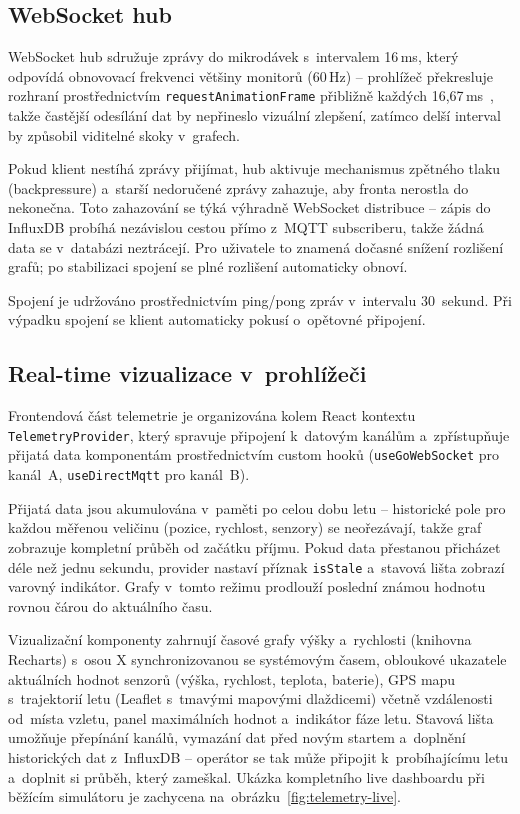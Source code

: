 \subsection{WebSocket hub}

WebSocket hub sdružuje zprávy do mikrodávek s~intervalem 16\,ms, který odpovídá obnovovací frekvenci většiny monitorů (60\,Hz) -- prohlížeč překresluje rozhraní prostřednictvím \texttt{request\-Animation\-Frame} přibližně každých 16{,}67\,ms~\cite{mdn2024raf}, takže častější odesílání dat by nepřineslo vizuální zlepšení, zatímco delší interval by způsobil viditelné skoky v~grafech.

Pokud klient nestíhá zprávy přijímat, hub aktivuje mechanismus zpětného tlaku (backpressure) a~starší nedoručené zprávy zahazuje, aby fronta nerostla do nekonečna. Toto zahazování se týká výhradně WebSocket distribuce -- zápis do InfluxDB probíhá nezávislou cestou přímo z~MQTT subscriberu, takže žádná data se v~databázi neztrácejí. Pro uživatele to znamená dočasné snížení rozlišení grafů; po stabilizaci spojení se plné rozlišení automaticky obnoví.

Spojení je udržováno prostřednictvím ping/pong zpráv v~intervalu 30~sekund. Při výpadku spojení se klient automaticky pokusí o~opětovné připojení.

\subsection{Real-time vizualizace v~prohlížeči}

\begin{sloppypar}
Frontendová část telemetrie je organizována kolem React kontextu \texttt{TelemetryProvider}, který spravuje připojení k~datovým kanálům a~zpřístupňuje přijatá data komponentám prostřednictvím custom hooků (\texttt{useGoWebSocket} pro kanál~A, \texttt{useDirectMqtt} pro kanál~B).
\end{sloppypar}

Přijatá data jsou akumulována v~paměti po celou dobu letu -- historické pole pro každou měřenou veličinu (pozice, rychlost, senzory) se neořezávají, takže graf zobrazuje kompletní průběh od začátku příjmu. Pokud data přestanou přicházet déle než jednu sekundu, provider nastaví příznak \texttt{isStale} a~stavová lišta zobrazí varovný indikátor. Grafy v~tomto režimu prodlouží poslední známou hodnotu rovnou čárou do aktuálního času.

Vizualizační komponenty zahrnují časové grafy výšky a~rychlosti (knihovna Recharts) s~osou X synchronizovanou se systémovým časem, obloukové ukazatele aktuálních hodnot senzorů (výška, rychlost, teplota, baterie), GPS mapu s~trajektorií letu (Leaflet s~tmavými mapovými dlaždicemi) včetně vzdálenosti od~místa vzletu, panel maximálních hodnot a~indikátor fáze letu. Stavová lišta umožňuje přepínání kanálů, vymazání dat před novým startem a~doplnění historických dat z~InfluxDB -- operátor se tak může připojit k~probíhajícímu letu a~doplnit si průběh, který zameškal. Ukázka kompletního live dashboardu při běžícím simulátoru je zachycena na~obrázku~\ref{fig:telemetry-live}.

